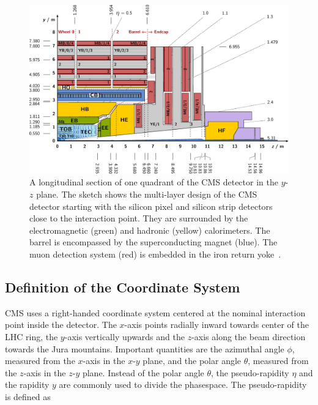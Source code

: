 \begin{figure}[htp]
    \centering
    \includegraphics[width=1.0\textwidth]{figures/cms_detector/cms_longitudinal_section.pdf}
    \caption[Longitudinal section of the CMS
    detector]{A longitudinal section of one quadrant of the CMS
        detector in the $y$-$z$ plane. The sketch shows
    the multi-layer design of the CMS detector starting with the silicon pixel
and silicon strip detectors close to the interaction point. They are surrounded
by the electromagnetic (green) and hadronic (yellow) calorimeters. The barrel is
encompassed by the superconducting magnet (blue). The muon detection system
(red) is embedded in the iron return yoke~\cite{Berger:2014aca}.}
    \label{fig:cms:longitudinal_section}
\end{figure}

\subsection{Definition of the Coordinate System}
\label{sec:coord_system}

CMS uses a right-handed coordinate system centered at the nominal interaction point inside the
detector. The $x$-axis points radially inward towards center of the LHC ring, the
$y$-axis vertically upwards and the $z$-axis along the beam direction towards
the Jura mountains. Important quantities are the azimuthal angle $\phi$,
measured from the $x$-axis in the $x$-$y$ plane, and the polar angle $\theta$,
measured from the $z$-axis in the $z$-$y$ plane. Instead of the polar angle
$\theta$, the pseudo-rapidity $\eta$ and the rapidity $y$ are commonly used to
divide the phasespace. The pseudo-rapidity is defined as

